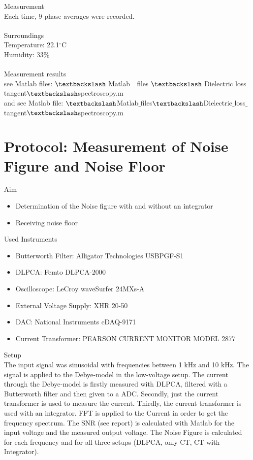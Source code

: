 {\Large Measurement} \\
Each time, 9 phase averages were recorded.\\ 
\\
{\Large  Surroundings} \\
Temperature: 22.1$^{\circ}$C\\
Humidity: 33\%\\
\\
{\Large Measurement results}\\
see Matlab files: $\textbackslash$ Matlab $\_$ files $\textbackslash$ Dielectric$\_$loss$\_$tangent$\textbackslash$spectroscopy.m\\
and see Matlab file: $\textbackslash$Matlab$\_$files$\textbackslash$Dielectric$\_$loss$\_$tangent$\textbackslash$spectroscopy.m


\section{Protocol: Measurement of Noise Figure and Noise Floor}
{\Large Aim}
\begin{itemize}
\item Determination of the Noise figure with and without an integrator 
\item Receiving noise floor 
\end{itemize}
{\Large Used Instruments}
\begin{itemize}
 \item Butterworth Filter: Alligator Technologies USBPGF-S1
 \item DLPCA: Femto DLPCA-2000
 \item Oscilloscope: LeCroy waveSurfer 24MXs-A
 \item External Voltage Supply:  XHR 20-50
 \item DAC: National Instruments cDAQ-9171
 \item Current Transformer: PEARSON CURRENT
MONITOR MODEL 2877
\end{itemize}
{\Large Setup} \\
The input signal was  sinusoidal with frequencies between 1 kHz and 10 kHz. The signal is applied to the Debye-model in the low-voltage setup. The current through the Debye-model is firstly measured with DLPCA, filtered with a Butterworth filter and then given to a ADC. Secondly, just the current transformer is used to measure the current. Thirdly, the current transformer is used with an integrator.  FFT is applied to the Current in order to get the frequency spectrum. The SNR (see report) is calculated with Matlab for the input voltage and the measured output voltage. The Noise Figure is calculated for each frequency and for all three setups (DLPCA, only CT, CT with Integrator).\\
